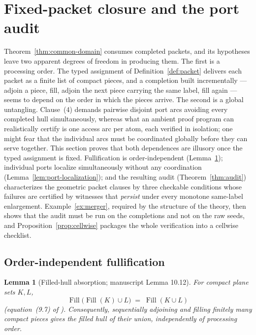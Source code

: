 \documentclass[11pt,reqno]{amsart}
\newtheorem{lemma}[theorem]{Lemma}
\theoremstyle{definition}
\theoremstyle{remark}
\newcommand{\Fill}{\operatorname{Fill}}
\begin{document}

\section{Fixed-packet closure and the port audit}\label{sec:audit}

Theorem~\ref{thm:common-domain} consumes completed packets, and its hypotheses leave
two apparent degrees of freedom in producing them. The first is a processing order.
The typed assignment of Definition~\ref{def:packet} delivers each packet as a finite
list of compact pieces, and a completion built incrementally --- adjoin a piece, fill,
adjoin the next piece carrying the same label, fill again --- seems to depend on the
order in which the pieces arrive. The second is a global untangling. Clause~(4)
demands pairwise disjoint port arcs avoiding every completed hull simultaneously,
whereas what an ambient proof program can realistically certify is one access arc per
atom, each verified in isolation; one might fear that the individual arcs must be
coordinated globally before they can serve together. This section proves that both
dependences are illusory once the typed assignment is fixed. Fullification is
order-independent (Lemma~\ref{lem:fill-absorption}); individual ports localize
simultaneously without any coordination (Lemma~\ref{lem:port-localization}); and the
resulting audit (Theorem~\ref{thm:audit}) characterizes the geometric packet clauses
by three checkable conditions whose failures are certified by witnesses that
\emph{persist} under every monotone same-label enlargement.
Example~\ref{ex:merger}, required by the structure of the theory, then shows that the
audit must be run on the completions and not on the raw seeds, and
Proposition~\ref{prop:cellwise} packages the whole verification into a cellwise
checklist.

\subsection{Order-independent fullification}\label{subsec:E-fill-algebra}

\begin{lemma}[Filled-hull absorption; manuscript Lemma 10.12]\label{lem:fill-absorption}
For compact plane sets $K,L$,
\begin{equation}\label{eq:E-absorption}
\Fill\bigl(\Fill(K)\cup L\bigr)\;=\;\Fill(K\cup L)
\end{equation}
(equation~(9.7) of \cite{MWman}). Consequently, sequentially adjoining and filling
finitely many compact pieces gives the filled hull of their union, independently of
processing order.
\end{lemma}
\end{document}
